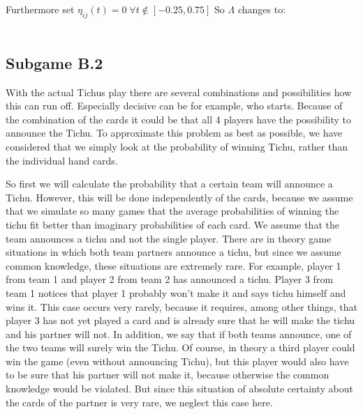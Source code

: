 Furthermore set $\eta_{ij}(t)=0\;\forall t\not\in [-0.25, 0.75]$
So $\Lambda$ changes to:
\\ \\
\noindent{}

\subsection{Subgame B.2}
With the actual Tichus play there are several combinations and possibilities how this can run off. Especially decisive can be for example, who starts. Because of the combination of the cards it could be that all 4 players have the possibility to announce the Tichu. To approximate this problem as best as possible, we have considered that we simply look at the probability of winning Tichu, rather than the individual hand cards.

So first we will calculate the probability that a certain team will announce a Tichu. However, this will be done independently of the cards, because we assume that we simulate so many games that the average probabilities of winning the tichu fit better than imaginary probabilities of each card.
We assume that the team announces a tichu and not the single player. There are in theory game situations in which both team partners announce a tichu, but since we assume common knowledge, these situations are extremely rare. For example, player 1 from team 1 and player 2 from team 2 has announced a tichu. Player 3 from team 1 notices that player 1 probably won't make it and says tichu himself and wins it. This case occurs very rarely, because it requires, among other things, that player 3 has not yet played a card and is already sure that he will make the tichu and his partner will not.
In addition, we say that if both teams announce, one of the two teams will surely win the Tichu. Of course, in theory a third player could win the game (even without announcing Tichu), but this player would also have to be sure that his partner will not make it, because otherwise the common knowledge would be violated. But since this situation of absolute certainty about the cards of the partner is very rare, we neglect this case here.

